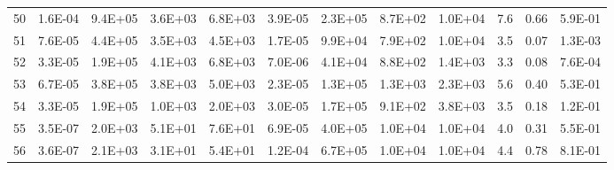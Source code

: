 \begin{tabular}{cccccccccccc}
50 & 1.6E-04 & 9.4E+05 & 3.6E+03 & 6.8E+03 & 3.9E-05 & 2.3E+05 & 8.7E+02 & 1.0E+04 & 7.6 & 0.66 & 5.9E-01 \\
51 & 7.6E-05 & 4.4E+05 & 3.5E+03 & 4.5E+03 & 1.7E-05 & 9.9E+04 & 7.9E+02 & 1.0E+04 & 3.5 & 0.07 & 1.3E-03 \\
52 & 3.3E-05 & 1.9E+05 & 4.1E+03 & 6.8E+03 & 7.0E-06 & 4.1E+04 & 8.8E+02 & 1.4E+03 & 3.3 & 0.08 & 7.6E-04 \\
53 & 6.7E-05 & 3.8E+05 & 3.8E+03 & 5.0E+03 & 2.3E-05 & 1.3E+05 & 1.3E+03 & 2.3E+03 & 5.6 & 0.40 & 5.3E-01 \\
54 & 3.3E-05 & 1.9E+05 & 1.0E+03 & 2.0E+03 & 3.0E-05 & 1.7E+05 & 9.1E+02 & 3.8E+03 & 3.5 & 0.18 & 1.2E-01 \\
55 & 3.5E-07 & 2.0E+03 & 5.1E+01 & 7.6E+01 & 6.9E-05 & 4.0E+05 & 1.0E+04 & 1.0E+04 & 4.0 & 0.31 & 5.5E-01 \\
56 & 3.6E-07 & 2.1E+03 & 3.1E+01 & 5.4E+01 & 1.2E-04 & 6.7E+05 & 1.0E+04 & 1.0E+04 & 4.4 & 0.78 & 8.1E-01 \\
\end{tabular}